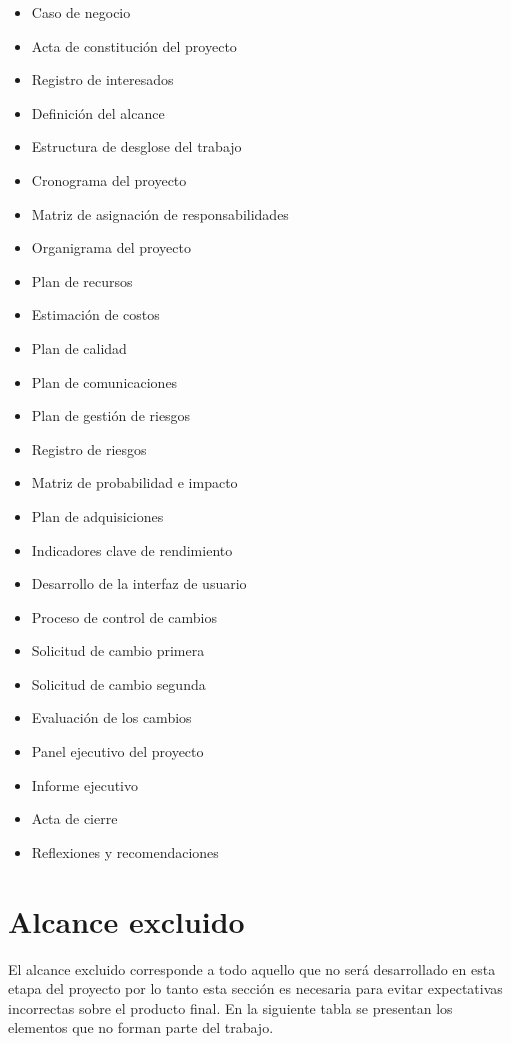\documentclass[11pt,spanish]{article}
\begin{document}
\begin{itemize}[leftmargin=*]
    \item Caso de negocio
    \item Acta de constitución del proyecto
    \item Registro de interesados
    \item Definición del alcance
    \item Estructura de desglose del trabajo
    \item Cronograma del proyecto
    \item Matriz de asignación de responsabilidades
    \item Organigrama del proyecto
    \item Plan de recursos
    \item Estimación de costos
    \item Plan de calidad
    \item Plan de comunicaciones
    \item Plan de gestión de riesgos
    \item Registro de riesgos
    \item Matriz de probabilidad e impacto
    \item Plan de adquisiciones
    \item Indicadores clave de rendimiento
    \item Desarrollo de la interfaz de usuario
    \item Proceso de control de cambios
    \item Solicitud de cambio primera
    \item Solicitud de cambio segunda
    \item Evaluación de los cambios
    \item Panel ejecutivo del proyecto
    \item Informe ejecutivo
    \item Acta de cierre
    \item Reflexiones y recomendaciones
\end{itemize}

\section{Alcance excluido}

El alcance excluido corresponde a todo aquello que no será desarrollado en esta etapa del proyecto por lo tanto esta sección es necesaria para evitar expectativas incorrectas sobre el producto final. En la siguiente tabla se presentan los elementos que no forman parte del trabajo.
\end{document}

